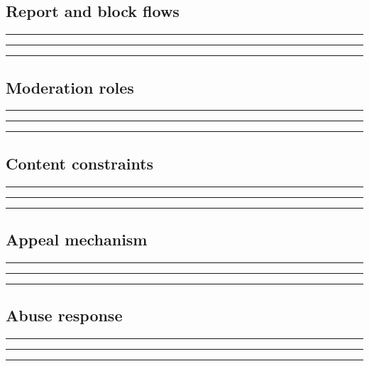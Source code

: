 \documentclass[11pt]{article}
\begin{document}
\subsection{Report and block flows}
\noindent\rule{\linewidth}{0.3pt}\par\vspace{0.18in}
\noindent\rule{\linewidth}{0.3pt}\par\vspace{0.18in}
\noindent\rule{\linewidth}{0.3pt}\par\vspace{0.14in}

\subsection{Moderation roles}
\noindent\rule{\linewidth}{0.3pt}\par\vspace{0.18in}
\noindent\rule{\linewidth}{0.3pt}\par\vspace{0.18in}
\noindent\rule{\linewidth}{0.3pt}\par\vspace{0.14in}

\subsection{Content constraints}
\noindent\rule{\linewidth}{0.3pt}\par\vspace{0.18in}
\noindent\rule{\linewidth}{0.3pt}\par\vspace{0.18in}
\noindent\rule{\linewidth}{0.3pt}\par\vspace{0.14in}

\subsection{Appeal mechanism}
\noindent\rule{\linewidth}{0.3pt}\par\vspace{0.18in}
\noindent\rule{\linewidth}{0.3pt}\par\vspace{0.18in}
\noindent\rule{\linewidth}{0.3pt}\par\vspace{0.14in}

\subsection{Abuse response}
\noindent\rule{\linewidth}{0.3pt}\par\vspace{0.18in}
\noindent\rule{\linewidth}{0.3pt}\par\vspace{0.18in}
\noindent\rule{\linewidth}{0.3pt}\par\vspace{0.14in}
\end{document}
